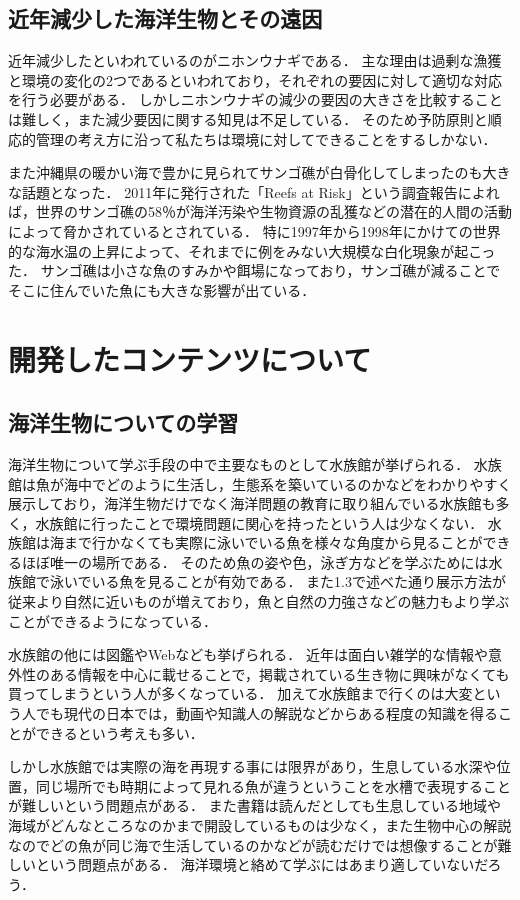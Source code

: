 \documentclass[12pt,a4j,titlepage]{ltjsarticle}
\begin{document}
\subsection{近年減少した海洋生物とその遠因}
近年減少したといわれているのがニホンウナギである．
主な理由は過剰な漁獲と環境の変化の2つであるといわれており，それぞれの要因に対して適切な対応を行う必要がある\cite{nihonunagi}．
しかしニホンウナギの減少の要因の大きさを比較することは難しく，また減少要因に関する知見は不足している．
そのため予防原則と順応的管理の考え方に沿って私たちは環境に対してできることをするしかない．\par
また沖縄県の暖かい海で豊かに見られてサンゴ礁が白骨化してしまったのも大きな話題となった．
2011年に発行された「Reefs at Risk」という調査報告によれば，世界のサンゴ礁の58％が海洋汚染や生物資源の乱獲などの潜在的人間の活動によって脅かされているとされている\cite{sango}．
特に1997年から1998年にかけての世界的な海水温の上昇によって、それまでに例をみない大規模な白化現象が起こった．
サンゴ礁は小さな魚のすみかや餌場になっており，サンゴ礁が減ることでそこに住んでいた魚にも大きな影響が出ている．
\clearpage


\section{開発したコンテンツについて}\label{開発したコンテンツ}
\subsection{海洋生物についての学習}
海洋生物について学ぶ手段の中で主要なものとして水族館が挙げられる．
水族館は魚が海中でどのように生活し，生態系を築いているのかなどをわかりやすく展示しており，海洋生物だけでなく海洋問題の教育に取り組んでいる水族館も多く，水族館に行ったことで環境問題に関心を持ったという人は少なくない．
水族館は海まで行かなくても実際に泳いでいる魚を様々な角度から見ることができるほぼ唯一の場所である．
そのため魚の姿や色，泳ぎ方などを学ぶためには水族館で泳いでいる魚を見ることが有効である．
また1.3で述べた通り展示方法が従来より自然に近いものが増えており，魚と自然の力強さなどの魅力もより学ぶことができるようになっている．\par
水族館の他には図鑑やWebなども挙げられる．
近年は面白い雑学的な情報や意外性のある情報を中心に載せることで，掲載されている生き物に興味がなくても買ってしまうという人が多くなっている．
加えて水族館まで行くのは大変という人でも現代の日本では，動画や知識人の解説などからある程度の知識を得ることができるという考えも多い．\par
しかし水族館では実際の海を再現する事には限界があり，生息している水深や位置，同じ場所でも時期によって見れる魚が違うということを水槽で表現することが難しいという問題点がある．
また書籍は読んだとしても生息している地域や海域がどんなところなのかまで開設しているものは少なく，また生物中心の解説なのでどの魚が同じ海で生活しているのかなどが読むだけでは想像することが難しいという問題点がある．
海洋環境と絡めて学ぶにはあまり適していないだろう．
\end{document}
